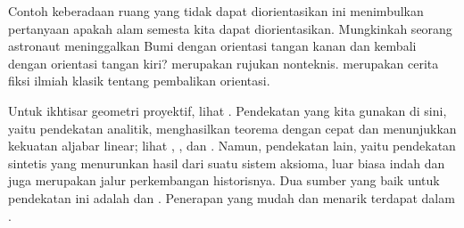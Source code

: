 Contoh keberadaan ruang yang tidak dapat diorientasikan ini menimbulkan
pertanyaan apakah alam semesta kita dapat diorientasikan.
Mungkinkah seorang astronaut meninggalkan Bumi dengan orientasi tangan kanan
dan kembali dengan orientasi tangan kiri?
\cite{Gardner} merupakan rujukan nonteknis.
\cite{Clarke} merupakan cerita fiksi ilmiah klasik tentang pembalikan orientasi.

Untuk ikhtisar geometri proyektif, lihat \cite{CourantRobbins}.
Pendekatan yang kita gunakan di sini, yaitu pendekatan analitik, menghasilkan
teorema dengan cepat dan %
menunjukkan kekuatan aljabar linear; lihat \cite{Hanes}, \cite{Ryan}, dan
\cite{Eggar}.
Namun, pendekatan lain, yaitu pendekatan sintetis yang menurunkan hasil dari
suatu sistem aksioma, luar biasa indah dan juga merupakan jalur perkembangan
historisnya.
Dua sumber yang baik untuk pendekatan ini adalah \cite{Coxeter} dan
\cite{Seidenberg}.
Penerapan yang mudah dan menarik terdapat dalam \cite{Davies}.

